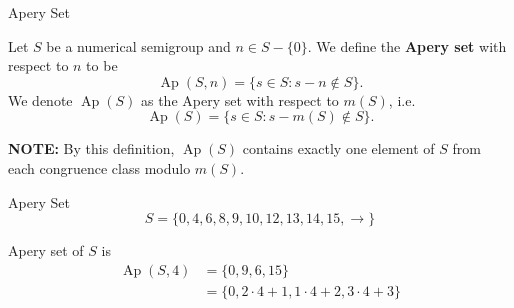 \documentclass{beamer}
\DeclareMathOperator{\Ap}{Ap}
\begin{document}
\begin{frame}{Apery Set}

Let $S$ be a numerical semigroup and $n\in S-\{0\}$. We define the \textbf{Apery set} with respect to $n$ to be 
\[\Ap(S,n)=\{s\in S:s-n\notin S\}.\] We denote $\Ap(S)$ as the Apery set with respect to $m(S)$, i.e.
\[\Ap(S)=\{s\in S:s-m(S)\notin S\}.\]

\textbf{NOTE:} By this definition, $\Ap(S)$ contains exactly one element of $S$ from each congruence class modulo $m(S)$.
\end{frame}

\begin{frame}{Apery Set}
    \[S=\{0,4,6,8,9,10,12,13,14,15,\to\}\]
    \begin{center}
    \end{center}\vspace{8pt}
    Apery set of $S$ is 
    \begin{align*}
        \Ap(S,4)&=\{0,9,6,15\}\\
                &=\{0,2\cdot 4+1,1\cdot 4+2,3\cdot 4+3\}
    \end{align*}
\end{frame}
\end{document}
